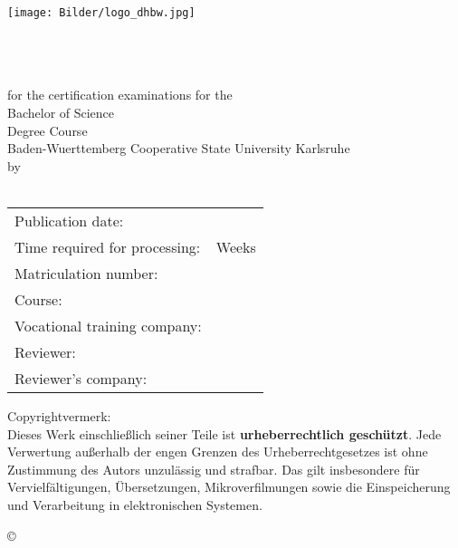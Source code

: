 \thispagestyle{plain}
\begin{titlepage}
\enlargethispage{4.0cm}
\sffamily 								%
				
\begin{flushright}
\texttt{[image: Bilder/logo\_dhbw.jpg]}\\[5ex]
\end{flushright}

\begin{center}

\huge{\textsc{\textbf{\titel}}}\\[1.5ex]
\Large{\textbf{\untertitel}}\\[5ex]
\LARGE{\textbf{\arbeit}}\\[2ex]
\normalsize{for the certification examinations for the\\[1ex] Bachelor of Science}\\[3ex]
\Large{Degree Course \studiengang}\\[1ex]
\normalsize{Baden-Wuerttemberg Cooperative State University Karlsruhe}\\[5ex]
by\\[1ex] \autor \\[18ex]


\end{center}

\begin{flushleft}

\begin{tabular}{ll}
Publication date:				& \quad \abgabe \\
Time required for processing:	& \quad 12 Weeks   \\ 
Matriculation number: 			& \quad \matrikelnr \\ 
Course: 						& \quad \kurs \\
Vocational training company:	& \quad \firma \\ 
Reviewer:  						& \quad \betreuerdhbw \\ 
Reviewer's company: 			& \quad \betreuerfirma \\ [5ex]

\end{tabular} 



\small
Copyrightvermerk:\\

Dieses Werk einschließlich seiner Teile ist \textbf{urheberrechtlich geschützt}. Jede Verwertung außerhalb der engen Grenzen des Urheberrechtgesetzes ist ohne Zustimmung des Autors unzulässig und strafbar. Das gilt insbesondere für Vervielfältigungen, Übersetzungen, Mikroverfilmungen sowie die Einspeicherung und Verarbeitung in elektronischen Systemen.
\end{flushleft}
\begin{flushright}
\copyright{} \jahr
\end{flushright}
\end{titlepage}